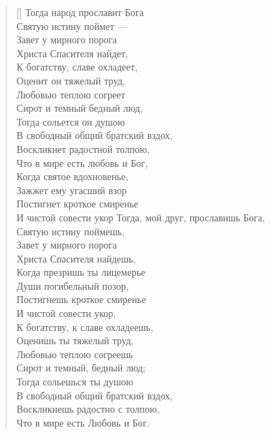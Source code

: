 \newpage
\vspace*{0cm}


\settowidth{\versewidth}{Тогда народ прославит Бога}
\begin{verse}[\versewidth]
Тогда народ прославит Бога\\
Святую истину поймет ---\\
Завет у мирного порога\\
Христа Спасителя найдет,\\
К богатству, славе охладеет,\\
Оценит он тяжелый труд,\\
Любовью теплою согреет\\
Сирот и темный бедный люд,\\
Тогда сольется он душою\\
В свободный общий братский вздох,\\
Воскликнет радостной толпою,\\
Что в мире есть любовь и Бог,\\
Когда святое вдохновенье,\\
Зажжет ему угасший взор\ldotst\\
Постигнет кроткое смиренье\\
И чистой совести укор\ldotst
Тогда, мой друг, прославишь Бога,\\
    Святую истину поймешь, \\
Завет у мирного порога\\
    Христа Спасителя найдешь, \\
Когда презришь ты лицемерье\\
    Души погибельный позор,\\
Постигнешь кроткое смиренье\\
    И чистой совести укор,\\
К богатству, к славе охладеешь,\\
    Оценишь ты тяжелый труд,\\
Любовью теплою согреешь\\
    Сирот и темный, бедный люд;\\
Тогда сольешься ты душою\\
    В свободный общий братский вздох,\\
Воскликнешь радостно с толпою,\\
    Что в мире есть Любовь и Бог.
\fi
\end{verse}

